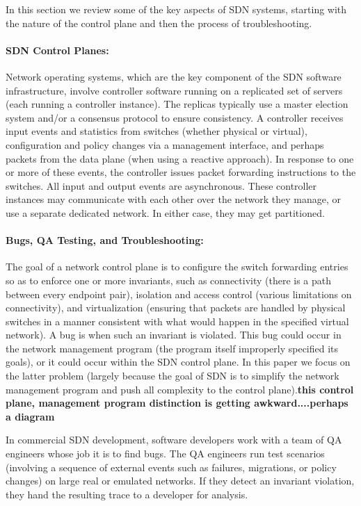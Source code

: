 In this section we review some of the key aspects of SDN systems, starting with the nature of the control plane and then the process of troubleshooting.

\paragraph{SDN Control Planes:}
Network operating systems, which are the key component of the SDN software infrastructure, involve controller software running on a replicated set of servers (each running a controller instance).  The replicas typically use a master election system and/or a consensus protocol to ensure consistency. A controller receives input events and statistics from switches (whether physical or virtual), configuration and policy changes via a management interface, and perhaps packets from the data plane (when using a reactive approach). In response to one or more of these events, the controller issues packet forwarding instructions to the switches.  All input and output events are asynchronous. These controller instances may communicate with each other over the network they manage, or use a separate dedicated network.  In either case, they may get partitioned.

\paragraph{Bugs, QA Testing, and Troubleshooting:}
The goal of a network control plane is to configure the switch forwarding entries so as to enforce one or more invariants, such as connectivity (there is a path between every endpoint pair), isolation and access control (\ie various limitations on connectivity), and virtualization (ensuring that packets are handled by physical switches in a manner consistent with what would happen in the specified virtual network). A bug is when such an invariant is violated. This bug could occur in the network management program (\ie the program itself improperly specified its goals), or it could occur within the SDN control plane. In this paper we focus on the latter problem (largely because the goal of SDN is to simplify the network management program and push all complexity to the control plane).{\bf this control plane, management program distinction is getting awkward....perhaps a diagram}

In commercial SDN development, software developers work with a team of QA engineers whose job it is to find bugs.  The QA engineers run test scenarios (\ie involving a sequence of external events such as failures, migrations, or policy changes) on large real or emulated networks.  If they detect an invariant violation, they hand the resulting trace to a developer for analysis. 

